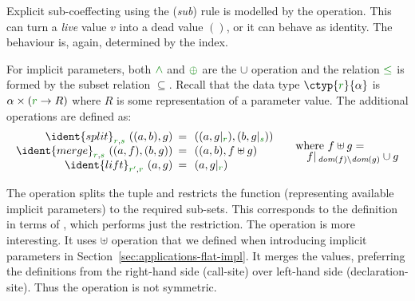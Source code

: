 Explicit sub-coeffecting using the (\emph{sub}) rule is modelled by the  operation.
This can turn a \emph{live} value $v$ into a dead value $()$, or it can behave as identity.
The behaviour is, again, determined by the index.

\begin{example}
For implicit parameters, both $\czip$ and $\cpar$ are the $\cup$ operation and the relation
$\cleq$ is formed by the subset relation $\subseteq$. Recall that the data type $\ctyp{\cclrd{r}}{\alpha}$
is $\alpha \times (\cclrd{r} \rightarrow R)$ where $R$ is some representation of a parameter value.
The additional operations are defined as:
%
\begin{equation*}
\begin{array}{rcl}
\ident{split}_{\cclrd{r}, \cclrd{s}}~((a,b), g) &\narrow{=}& ((a, \restr{g}{\cclrd{r}}), (b, \restr{g}{\cclrd{s}}))\\
\ident{merge}_{\cclrd{r}, \cclrd{s}}~((a, f), (b, g)) &\narrow{=}& ((a, b), f \uplus g)\\
\ident{lift}_{\cclrd{r'}, \cclrd{r}}~(a, g) &\narrow{=}& (a, \restr{g}{\cclrd{r}})\\
\end{array}
\quad
\begin{array}{l}
\textnormal{where}~f \uplus g = \\[-0.25em]
\quad\restr{f}{\, \textit{dom}(f) \setminus \textit{dom}(g)} \cup g 
\end{array}
\end{equation*}
\end{example}

\noindent
The  operation splits the tuple and restricts the function (representing available
implicit parameters) to the required sub-sets. This corresponds to the definition in terms
of , which performs just the restriction. The  operation is more 
interesting. It uses $\uplus$ operation that we defined when introducing implicit parameters
in Section~\ref{sec:applications-flat-impl}. It merges the values, preferring the definitions from
the right-hand side (call-site) over left-hand side (declaration-site). Thus the operation is not
symmetric.

